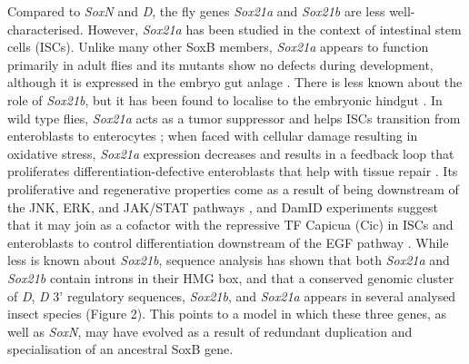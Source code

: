 \documentclass[withindex,glossary]{cam-thesis}
\begin{document}
Compared to \emph{SoxN} and \emph{D}, the fly genes \emph{Sox21a} and
\emph{Sox21b} are less well-characterised. However, \emph{Sox21a} has
been studied in the context of intestinal stem cells (\gls{ISCs}). Unlike many
other SoxB members, \emph{Sox21a} appears to function primarily in adult
flies and its mutants show no defects during development, although it is
expressed in the embryo gut anlage . There is less known about the role of \emph{Sox21b}, but
it has been found to localise to the embryonic hindgut . In wild type flies, \emph{Sox21a} acts as
a tumor suppressor and helps ISCs transition from enteroblasts to
enterocytes ; when faced with
cellular damage resulting in oxidative stress, \emph{Sox21a} expression
decreases and results in a feedback loop that proliferates
differentiation-defective enteroblasts that help with tissue repair . Its proliferative and regenerative properties come
as a result of being downstream of the JNK, ERK, and JAK/STAT pathways
, and DamID experiments suggest
that it may join as a cofactor with the repressive TF Capicua (Cic) in
ISCs and enteroblasts to control differentiation downstream of the EGF
pathway . While less is known about \emph{Sox21b},
sequence analysis has shown that both \emph{Sox21a} and \emph{Sox21b}
contain introns in their HMG box, and that a conserved genomic cluster
of \emph{D}, \emph{D} 3' regulatory sequences, \emph{Sox21b}, and
\emph{Sox21a}  appears in several analysed insect species (Figure 2). This points to
a model in which these three genes, as well as \emph{SoxN}, may have
evolved as a result of redundant duplication and specialisation of an ancestral SoxB gene.
\end{document}

